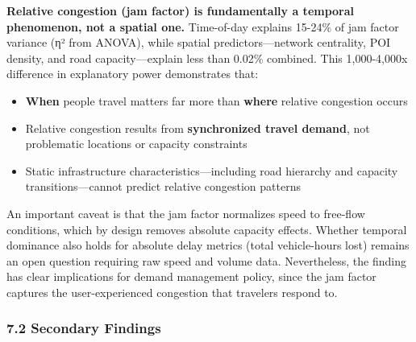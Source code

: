 \documentclass[
  12pt,
]{article}
\providecommand{\tightlist}{%
  \setlength{\itemsep}{0pt}\setlength{\parskip}{0pt}}
\begin{document}
\textbf{Relative congestion (jam factor) is fundamentally a temporal phenomenon, not a spatial one.} Time-of-day explains 15-24\% of jam factor variance (η² from ANOVA), while spatial predictors---network centrality, POI density, and road capacity---explain less than 0.02\% combined. This 1,000-4,000x difference in explanatory power demonstrates that:

\begin{itemize}
\tightlist
\item
  \textbf{When} people travel matters far more than \textbf{where} relative congestion occurs
\item
  Relative congestion results from \textbf{synchronized travel demand}, not problematic locations or capacity constraints
\item
  Static infrastructure characteristics---including road hierarchy and capacity transitions---cannot predict relative congestion patterns
\end{itemize}

An important caveat is that the jam factor normalizes speed to free-flow conditions, which by design removes absolute capacity effects. Whether temporal dominance also holds for absolute delay metrics (total vehicle-hours lost) remains an open question requiring raw speed and volume data. Nevertheless, the finding has clear implications for demand management policy, since the jam factor captures the user-experienced congestion that travelers respond to.

\subsubsection{7.2 Secondary Findings}\label{secondary-findings}
\end{document}
